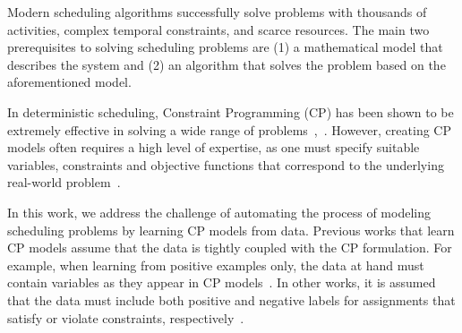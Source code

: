 \label{sec:introduction}

Modern scheduling algorithms 
successfully solve
problems with thousands of
activities, complex temporal constraints,
and scarce resources. The main two prerequisites to 
solving scheduling problems are 
(1) a mathematical
model that describes the system
and (2) an algorithm that 
solves the problem based on the aforementioned model.

In deterministic scheduling,
Constraint Programming (CP) has been shown to 
be extremely effective in solving a wide range
of problems~\cite[Chapter 6]{Baptiste:2001},~\cite{lallouet2010learning}.  
However, creating CP
models  
often requires 
a high level
of expertise, as one must specify 
suitable variables, constraints and objective
functions that 
correspond to the underlying real-world problem~\cite{lallouet2010learning}. 

In this work, we address the challenge
of automating 
the process of modeling scheduling problems
by learning CP models from data. Previous works
that learn CP models 
assume that the data is tightly coupled 
with the CP formulation. 
For example, when learning from positive
examples only, the data at hand must contain
variables as they appear in CP models~\cite{beldiceanu2012model}. In other works,
it is assumed that
the data must include 
both positive and negative labels for
assignments that satisfy 
or violate constraints, respectively~\cite{lallouet2010learning}. 


